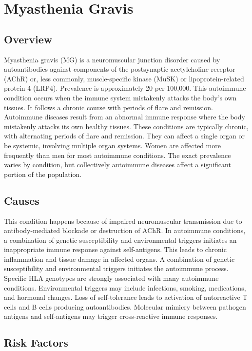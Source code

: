 \chapter{Myasthenia Gravis}
\label{sec:Myasthenia Gravis}

\section{Overview}
Myasthenia gravis (MG) is a neuromuscular junction disorder caused by autoantibodies against components of the postsynaptic acetylcholine receptor (AChR) or, less commonly, muscle-specific kinase (MuSK) or lipoprotein-related protein 4 (LRP4). Prevalence is approximately 20 per 100,000. This autoimmune condition occurs when the immune system mistakenly attacks the body's own tissues. It follows a chronic course with periods of flare and remission. Autoimmune diseases result from an abnormal immune response where the body mistakenly attacks its own healthy tissues. These conditions are typically chronic, with alternating periods of flare and remission. They can affect a single organ or be systemic, involving multiple organ systems. Women are affected more frequently than men for most autoimmune conditions. The exact prevalence varies by condition, but collectively autoimmune diseases affect a significant portion of the population.
\section{Causes}
This condition happens because of impaired neuromuscular transmission due to antibody-mediated blockade or destruction of AChR. In autoimmune conditions, a combination of genetic susceptibility and environmental triggers initiates an inappropriate immune response against self-antigens. This leads to chronic inflammation and tissue damage in affected organs. A combination of genetic susceptibility and environmental triggers initiates the autoimmune process. Specific HLA genotypes are strongly associated with many autoimmune conditions. Environmental triggers may include infections, smoking, medications, and hormonal changes. Loss of self-tolerance leads to activation of autoreactive T cells and B cells producing autoantibodies. Molecular mimicry between pathogen antigens and self-antigens may trigger cross-reactive immune responses.
\section{Risk Factors}

